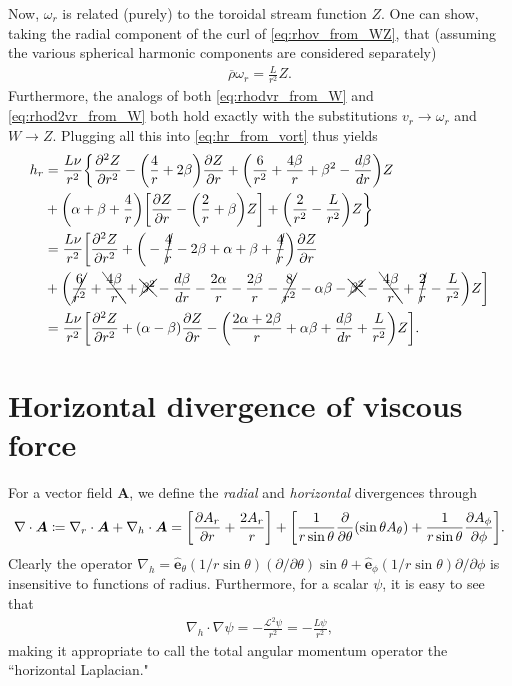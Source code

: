 \documentclass[12pt]{article} %
\newcommand{\pderiv}[2]{\frac{\partial#1}{\partial#2}}
\newcommand{\ppderiv}[2]{\frac{\partial^2#1}{\partial#2^2}}
\newcommand{\e}{\hat{\bm{e}}}
\newcommand{\rhobar}{\overline{\rho}}
\newcommand{\Div}{\nabla\cdot}
\newcommand{\divh}{\nabla_h\cdot}
\newcommand{\divr}{\nabla_r\cdot}
\begin{document}
	Now, $\omega_r$ is related (purely) to the toroidal stream function $Z$. One can show, taking the radial component of the curl of \eqref{eq:rhov_from_WZ}, that (assuming the various spherical harmonic components are considered separately)
	\begin{align}
	\rhobar \omega_r = \frac{L}{r^2}Z.
	\label{eq:rhoomr_from_Z}
	\end{align}
	Furthermore, the analogs of both \eqref{eq:rhodvr_from_W} and \eqref{eq:rhod2vr_from_W} both hold exactly with the substitutions $v_r\rightarrow\omega_r$ and $W\rightarrow Z$. Plugging all this into \eqref{eq:hr_from_vort} thus yields
	\begin{align}
	h_r &= \frac{L\nu}{r^2}\bigg{\{}\ppderiv{Z}{r}-\bigg{(}\frac{4}{r}+2\beta\bigg{)}\pderiv{Z}{r} + \bigg{(}\frac{6}{r^2} + \frac{4\beta}{r} + \beta^2 - \frac{d\beta}{dr}\bigg{)}Z \nonumber\\
	&+ \bigg{(}\alpha+\beta+\frac{4}{r}\bigg{)}\bigg{[}\pderiv{Z}{r} -\bigg{(}\frac{2}{r}+\beta\bigg{)}Z\bigg{]} + \bigg{(}\frac{2}{r^2}-\frac{L}{r^2}\bigg{)}Z\bigg{\}}\nonumber\\
	&= \frac{L\nu}{r^2}\bigg{[}\ppderiv{Z}{r}+\bigg{(}-\cancel{\frac{4}{r}} -2\beta + \alpha + \beta + \cancel{\frac{4}{r}}\bigg{)}\pderiv{Z}{r}\nonumber\\
	&+\bigg{(}\cancel{\frac{6}{r^2}}+\bcancel{\frac{4\beta}{r}} + \xcancel{\beta^2}-\frac{d\beta}{dr} - \frac{2\alpha}{r} - \frac{2\beta}{r} - \cancel{\frac{8}{r^2}} - \alpha\beta - \xcancel{\beta^2} - \bcancel{\frac{4\beta}{r}} + \cancel{\frac{2}{r}} - \frac{L}{r^2}\bigg{)}Z\bigg{]}\nonumber\\
	&= \frac{L\nu}{r^2}\bigg{[}\ppderiv{Z}{r} + (\alpha-\beta)\pderiv{Z}{r} - \bigg{(}\frac{2\alpha+2\beta}{r} + \alpha\beta + \frac{d\beta}{dr} + \frac{L}{r^2}\bigg{)}Z\bigg{]}.
	\end{align}
	
	\section{Horizontal divergence of viscous force}
	For a vector field $\bm{A}$, we define the \textit{radial} and \textit{horizontal} divergences through
	\begin{align}
	\Div\bm{A} \coloneqq \divr\bm{A}+\divh\bm{A} = \bigg{[}\pderiv{A_r}{r} + \frac{2A_r}{r}\bigg{]} + \bigg{[}\frac{1}{r\sin\theta}\pderiv{}{\theta}(\sin\theta A_\theta)
	+ \frac{1}{r\sin\theta}\pderiv{A_\phi}{\phi}\bigg{]}.
	\label{def:divr_and_divh}
	\end{align}
	Clearly the operator $\nabla_h = \e_\theta(1/r\sin\theta)(\partial/\partial\theta)\sin\theta + \e_\phi(1/r\sin\theta)\partial/\partial\phi$ is insensitive to functions of radius. Furthermore, for a scalar $\psi$, it is easy to see that 
	\begin{align}
	\divh\nabla\psi = -\frac{\mathscr{L}^2\psi}{r^2}= -\frac{L\psi}{r^2},
	\label{eq:hlaplacian}
	\end{align}
	making it appropriate to call the total angular momentum operator the ``horizontal Laplacian."
	
\end{document}
